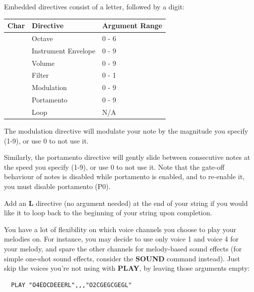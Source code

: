 \begin{description}[leftmargin=2cm,style=nextline]
Embedded directives consist of a letter, followed by a digit:

\begin{center}
{\setlength{\tabcolsep}{1mm}
\begin{tabular}{*{1}{|C{9mm}}|l|l|}
\hline
{\bf Char}  & {\bf Directive} & {\bf Argument Range} \\
\hline
{} & Octave              & 0 - 6 \\
 & Instrument Envelope & 0 - 9 \\
 & Volume              & 0 - 9 \\
 & Filter              & 0 - 1 \\
 & Modulation          & 0 - 9 \\
 & Portamento          & 0 - 9 \\
 & Loop                & N/A   \\
\hline
\end{tabular}
}
\end{center}

  The modulation directive will modulate your note by the magnitude you specify (1-9), or use 0 to not use it.

    Similarly, the portamento directive will gently slide between consecutive notes at the speed you specify (1-9), or use 0 to not use it. Note that the gate-off behaviour of notes is disabled while portamento is enabled, and to re-enable it, you must disable portamento (P0).

    Add an {\bf L} directive (no argument needed) at the end of your string if you would like it to loop back to the
  beginning of your string upon completion.

  You have a lot of flexibility on which voice channels you choose to play your melodies on.
  For instance, you may decide to use only voice 1 and voice 4 for your melody, and spare
  the other channels for melody-based sound effects (for simple one-shot sound effects,
  consider the {\bf SOUND} command instead). Just skip the voices you're not using with
  {\bf PLAY}, by leaving those arguments empty:

\begin{tcolorbox}[colback=black,coltext=white]
\verbatimfont{\codefont}
\begin{verbatim}
  PLAY "O4EDCDEEERL",,,"O2CGEGCGEGL"
\end{verbatim}
\end{tcolorbox}


\end{description}
